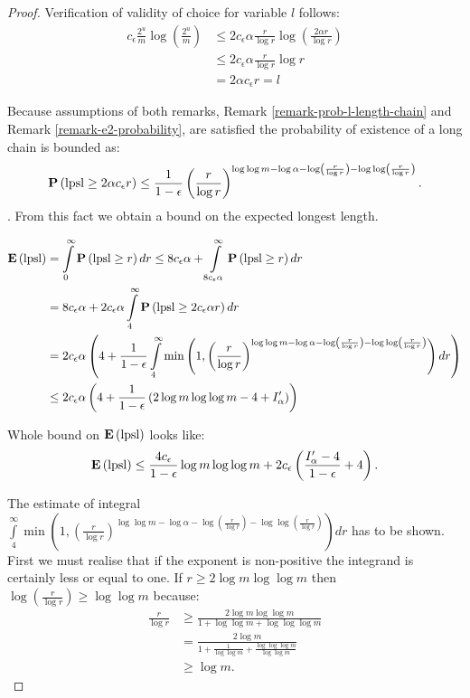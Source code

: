 \begin{proof}
Verification of validity of choice for variable $l$ follows:
\[
\begin{split}
c_\epsilon \frac{2 ^ u}{m} \log \left( \frac{2 ^ u}{m} \right) 
	& \leq 2 c_\epsilon \alpha \frac{r}{\log r} \log \left( \frac{2 \alpha r}{\log r} \right) \\
	& \leq 2 c_\epsilon \alpha \frac{r}{\log r} \log r \\
	& = 2 \alpha c_\epsilon r = l
\end{split}
\]

Because assumptions of both remarks, Remark \ref{remark-prob-l-length-chain} and Remark \ref{remark-e2-probability}, are satisfied the probability of existence of a long chain is bounded as: \[ \mathbf{P}\left(\mathrm{lpsl} \geq 2 \alpha c_\epsilon r\right) \leq \frac{1}{1 - \epsilon} \left(\frac{r}{\log r}\right)^{\log \log m - \log \alpha - \log \left(\frac{r}{\log r}\right) - \log \log \left(\frac{r}{\log r}\right)} \text{.}\]. From this fact we obtain a bound on the expected longest length.

\[
\begin{split}
\mathbf{E}\left(\mathrm{lpsl}\right)
	& = \int\limits_0^\infty \mathbf{P}\left(\mathrm{lpsl} \geq r\right) dr \leq 8 c_\epsilon \alpha + \int\limits_{8 c_\epsilon \alpha}^\infty \mathbf{P}\left(\mathrm{lpsl} \geq r\right) dr \\ 
	& = 8c_\epsilon \alpha + 2 c_\epsilon \alpha \int\limits_{4}^\infty \mathbf{P}\left(\mathrm{lpsl} \geq 2c_\epsilon \alpha r\right) dr \\
	& = 2c_\epsilon \alpha \left(4 + \frac{1}{1 - \epsilon} \int\limits_{4}^\infty \min\left(1, \left(\frac{r}{\log r}\right)^{\log \log m - \log \alpha - \log \left(\frac{r}{\log r}\right) - \log \log \left(\frac{r}{\log r}\right)}\right) dr \right) \\ 
	& \leq 2c_\epsilon \alpha \left( 4 + \frac{1}{1-\epsilon}\left( 2 \log m \log \log m - 4 + I'_\alpha \right) \right) \\
\end{split}
\]

Whole bound on $\mathbf{E}\left(\mathrm{lpsl}\right)$ looks like:
\[
\mathbf{E}\left(\mathrm{lpsl}\right) \leq \frac{4c_\epsilon}{1 - \epsilon} \log m \log \log m + 2 c_\epsilon \left( \frac{I'_\alpha - 4}{1 - \epsilon} + 4 \right) \text{.}
\]

The estimate of integral $\int\limits_{4}^\infty \min \left(1, \left(\frac{r}{\log r}\right)^{\log \log m - \log \alpha - \log \left(\frac{r}{\log r}\right) - \log \log \left(\frac{r}{\log r}\right)}\right) dr$ has to be shown. First we must realise that if the exponent is non-positive the integrand is certainly less or equal to one. If $r \geq 2 \log m \log \log m$ then $\log \left( \frac{r}{\log r} \right) \geq \log \log m$ because:
\[
\begin{split}
\frac{r}{\log r} 
	& \geq \frac{2 \log m \log \log m}{1 + \log \log m + \log \log \log m} \\
	& = \frac{2 \log m}{1 + \frac{1}{\log \log m} + \frac{\log \log \log m}{\log \log m}} \\
	& \geq \log m \text{.}
\end{split}
\]


\end{proof}
